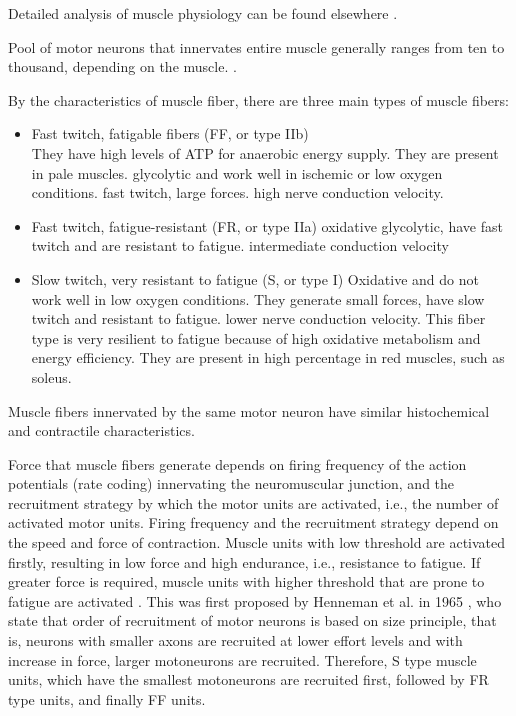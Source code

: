 Detailed analysis of muscle physiology can be found elsewhere \citep{Squire1986}.

Pool of motor neurons that innervates entire muscle generally ranges from ten to thousand, depending on the muscle. \citep{Merletti-Farina-book}.

By the characteristics of muscle fiber, there are three main types of muscle fibers:
\begin{itemize}
\item Fast twitch, fatigable fibers (FF, or type IIb)\\
They have high levels of ATP for anaerobic energy supply. They are present in pale muscles. glycolytic and work well in ischemic or low oxygen conditions. fast twitch, large forces. high nerve conduction velocity. 
\item Fast twitch, fatigue-resistant (FR, or type IIa)
oxidative glycolytic, have fast twitch and are resistant to fatigue. intermediate conduction velocity 

\item Slow twitch, very resistant to fatigue (S, or type I)
Oxidative and do not work well in low oxygen conditions. They generate small forces, have slow twitch and resistant to fatigue. lower nerve conduction velocity. This fiber type is very resilient to fatigue because of high oxidative metabolism and energy efficiency. They are present in high percentage in red muscles, such as soleus.
\end{itemize}

Muscle fibers innervated by the same motor neuron have similar histochemical and contractile characteristics.

Force that muscle fibers generate depends on firing frequency of the action potentials (rate coding) innervating the neuromuscular junction, and the recruitment strategy by which the motor units are activated, i.e., the number of activated motor units. Firing frequency and the recruitment strategy depend on the speed and force of contraction. Muscle units with low threshold are activated firstly, resulting in low force and high endurance, i.e., resistance to fatigue. If greater force is required, muscle units with higher threshold that are prone to fatigue are activated \citep{Freund1975, Merletti-book}. This was first proposed by Henneman et al. in 1965 \citep{Henneman1965}, who state that order of recruitment of motor neurons is based on size principle, that is, neurons with smaller axons are recruited at lower effort levels and with increase in force, larger motoneurons are recruited. Therefore, S type muscle units, which have the smallest motoneurons are recruited first, followed by FR type units, and finally FF units. 



